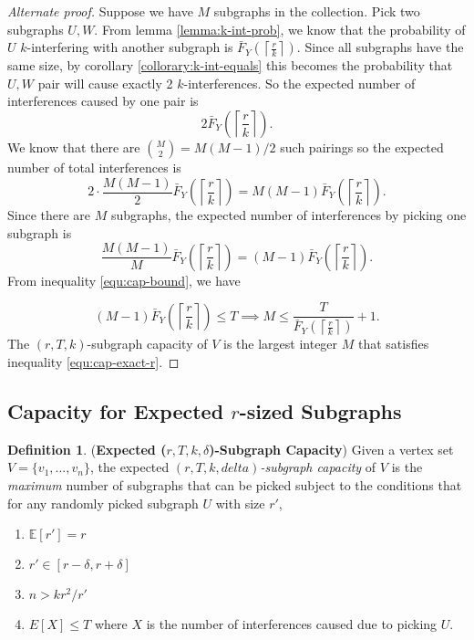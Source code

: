 \documentclass[10pt]{extarticle}
\theoremstyle{definition}
\newtheorem{definition}[theorem]{Definition}
\begin{document}
\begin{proof}[Alternate proof]
    Suppose we have $M$ subgraphs in the collection. Pick two subgraphs $U,W$. From lemma \ref{lemma:k-int-prob}, we know that the probability of $U$ $k$-interfering with another subgraph is $\bar{F}_Y\left(\left\lceil \frac{r}{k} \right\rceil\right)$. Since all subgraphs have the same size, by corollary \ref{collorary:k-int-equals} this becomes the probability that $U,W$ pair will cause exactly 2 $k$-interferences. So the expected number of interferences caused by one pair is
    $$
    2\bar{F}_Y\left(\left\lceil \frac{r}{k} \right\rceil\right).
    $$
    We know that there are $\binom{M}{2} = M(M-1)/2$ such pairings so the expected number of total interferences is
    $$
    2 \cdot \frac{M(M-1)}{2} \bar{F}_Y\left(\left\lceil \frac{r}{k} \right\rceil\right)  =  M(M-1) \bar{F}_Y\left(\left\lceil \frac{r}{k} \right\rceil\right). 
    $$
    Since there are $M$ subgraphs, the expected number of interferences by picking one subgraph is
    $$
    \frac{M(M-1)}{M} \bar{F}_Y\left(\left\lceil \frac{r}{k} \right\rceil\right)  = (M-1) \bar{F}_Y\left(\left\lceil \frac{r}{k} \right\rceil\right).
    $$
    From inequality \ref{equ:cap-bound}, we have 

    \begin{equation*}
        (M-1) \bar{F}_Y\left(\left\lceil \frac{r}{k} \right\rceil\right) \le T \implies M \le \frac{T}{\bar{F}_Y\left(\left\lceil \frac{r}{k} \right\rceil\right)} + 1.
    \end{equation*}
The $(r,T,k)$-subgraph capacity of $V$ is the largest integer $M$ that satisfies inequality \ref{equ:cap-exact-r}.
\end{proof}

\subsection{Capacity for Expected $r$-sized Subgraphs}

\begin{definition} (\textbf{Expected (\textit{$r,T,k,\delta$})-Subgraph Capacity}) Given a vertex set $V = \{v_1,...,v_n\}$, the expected \textit{$(r,T,k,delta)$-subgraph capacity} of $V$ is the \textit{maximum} number of subgraphs that can be picked subject to the conditions that for any randomly picked subgraph $U$ with size $r'$,
    \begin{enumerate}
        \item $\mathbb{E}[r'] = r$
        \item $r' \in [r-\delta,r+\delta]$
        \item $n > kr^2/r'$
        \item \label{equ:cap-bound-expected}$E[X] \le T$ where $X$ is the number of interferences caused due to picking $U$. 
    \end{enumerate}
    \end{definition}
\end{document}
